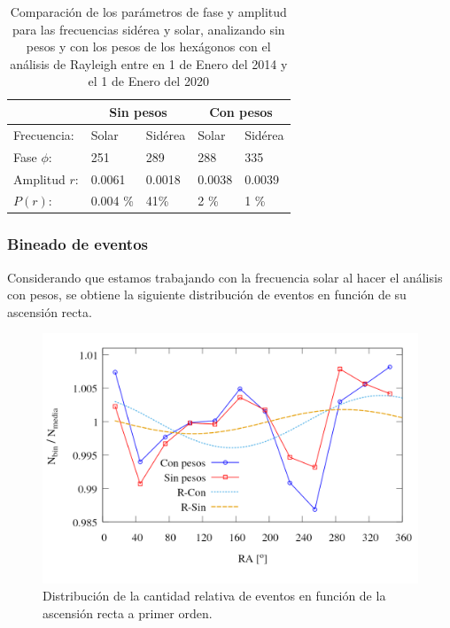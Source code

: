 		\begin{table}[H]
		\centering
		\begin{tabular}{l|l|l|l|l}
			\multicolumn{1}{c}{}  & \multicolumn{2}{c}{Sin pesos}  & \multicolumn{2}{|c}{Con pesos} \\ \hline
			Frecuencia:   & Solar         & Sidérea        & Solar         & Sidérea        \\ \hline
			Fase $\phi$:  & 251           & 289            & 288           & 335            \\ \hline
			Amplitud $r$: & 0.0061        & 0.0018         & 0.0038        & 0.0039         \\ \hline
			$P(r)$:	      & 0.004 \%	  & 41\%	   	   & 2 \%          & 1 \% 	\\
		\end{tabular}
		\caption{Comparación de los parámetros de fase y amplitud para las frecuencias sidérea y solar, analizando sin pesos y con los pesos de los hexágonos con el análisis de Rayleigh entre en 1 de Enero del 2014 y el 1 de Enero del 2020}
		\end{table}
		


	\subsubsection{Bineado de eventos }


	Considerando que estamos trabajando con la frecuencia solar al hacer el análisis con pesos, se obtiene la siguiente distribución de eventos en función de su ascensión recta.
	\begin{figure}[H]
		\centering
		\includegraphics[width=0.75\linewidth]{eventos_clasificados_por_RA_v4.png}
		\caption{Distribución de la cantidad relativa de eventos en función de la ascensión recta a primer orden.}
	\end{figure}

